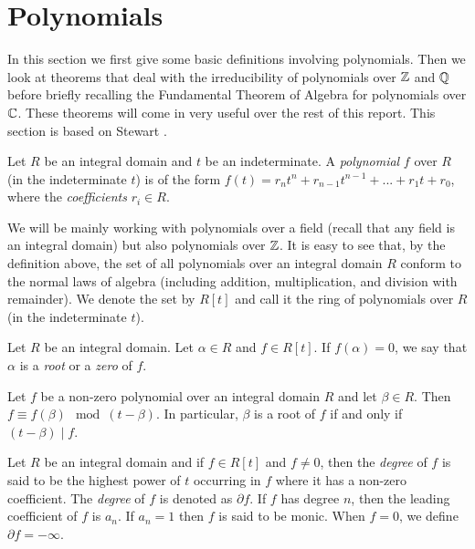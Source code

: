 

\section{Polynomials}
In this section we first give some basic definitions involving polynomials. Then we look at theorems that deal with the irreducibility of polynomials over $\mathbb Z$ and $\mathbb Q$ before briefly recalling the Fundamental Theorem of Algebra for polynomials over $\mathbb C$. These theorems will come in very useful over the rest of this report. This section is based on Stewart \cite[Chapters~2-3]{Stewart}. 

\begin{definition}
    Let $R$ be an integral domain and $t$ be an indeterminate. A \textit{polynomial} $f$ over $R$ (in the indeterminate $t$) is of the form $f(t) = r_n t^n + r_{n-1} t^{n-1} + ... + r_1 t + r_0$, where the \textit{coefficients} $r_i \in R$. 
\end{definition}

We will be mainly working with polynomials over a field (recall that any field is an integral domain) but also polynomials over $\mathbb Z$. It is easy to see that, by the definition above, the set of all polynomials over an integral domain $R$ conform to  the normal laws of algebra (including addition, multiplication, and division with remainder). We denote the set by $R[t]$ and call it the ring of polynomials over $R$ (in the indeterminate $t$). 

\begin{definition}
	Let $R$ be an integral domain. Let $\alpha \in R$ and $f \in R[t]$. If $f(\alpha) = 0$, we say that $\alpha$ is a \textit{root} or a \textit{zero} of $f$. 
\end{definition}

\begin{theorem} \label{thm:remainder}
	Let $f$ be a non-zero polynomial over an integral domain $R$ and let $\beta \in R$. Then $f \equiv f(\beta) \mod (t - \beta)$. 
	In particular, $\beta$ is a root of $f$ if and only if $(t - \beta) \mid f$. 
\end{theorem}


\begin{definition}
    Let $R$ be an integral domain and if $f \in R[t]$ and $f \neq 0$, then the \textit{degree} of $f$ is said to be the highest power of $t$ occurring in $f$ where it has a non-zero coefficient. The \textit{degree} of $f$ is denoted as $\partial f$. If $f$ has degree $n$, then the leading coefficient of $f$ is $a_n$. If $a_n = 1$ then $f$ is said to be monic. When $f = 0$, we define $\partial f = - \infty$.
\end{definition}



